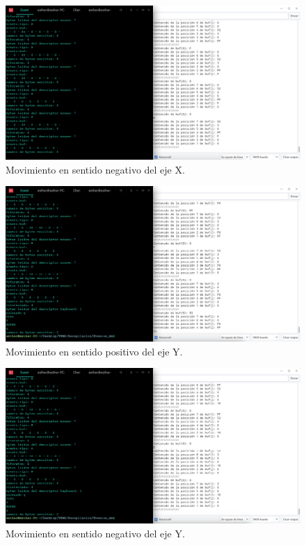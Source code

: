     \begin{figure}
    \centering
    \includegraphics[scale = 0.5]{capitulo_04/figuras_dir/movx-.jpg}
    \caption{Movimiento en sentido negativo del eje X.}
    \end{figure}

    \begin{figure}
    \centering
    \includegraphics[scale = 0.45]{capitulo_04/figuras_dir/movy+.jpg}
    \caption{Movimiento en sentido positivo del eje Y.}
    \end{figure}

    \begin{figure}
    \centering
    \includegraphics[scale = 0.45]{capitulo_04/figuras_dir/movy-.jpg}
    \caption{Movimiento en sentido negativo del eje Y.}
    \end{figure}

